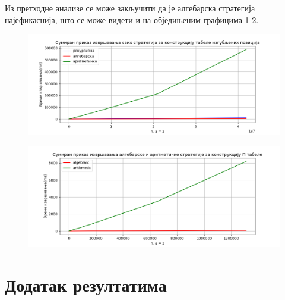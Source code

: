 \documentclass[a4paper]{article}
\begin{document}
Из претходне анализе се може закључити да је алгебарска стратегија најефикаснија, што се може видети и на обједињеним графицима \ref{fig:all} \ref{fig:algebraicVSarithmetic}.

\begin{figure}[H]
	\label{fig:all}
	\centering
	\includegraphics[width=\textwidth]{all.png}
\end{figure}

\begin{figure}[H]
	\label{fig:algebraicVSarithmetic}
	\centering
	\includegraphics[width=\textwidth]{algebraicVSarithmetic.png}
\end{figure}

\appendix
\section{Додатак резултатима}



\appendix
 

\end{document}
